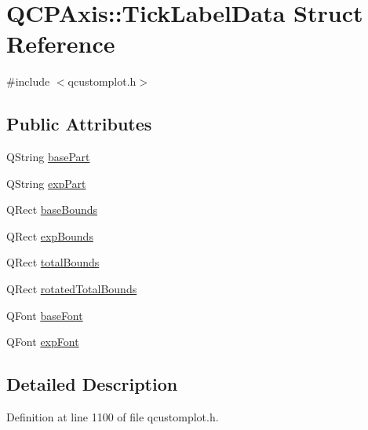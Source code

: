 \hypertarget{struct_q_c_p_axis_1_1_tick_label_data}{\section{Q\-C\-P\-Axis\-:\-:Tick\-Label\-Data Struct Reference}
\label{struct_q_c_p_axis_1_1_tick_label_data}
}


{\ttfamily \#include $<$qcustomplot.\-h$>$}

\subsection*{Public Attributes}
\begin{DoxyCompactItemize}
\item 
Q\-String \hyperlink{struct_q_c_p_axis_1_1_tick_label_data_a90d8d1e5d4706518e6b9e30371bf0346}{base\-Part}
\item 
Q\-String \hyperlink{struct_q_c_p_axis_1_1_tick_label_data_aa6dc7fb45b835a5fdd04ae28fc5e636f}{exp\-Part}
\item 
Q\-Rect \hyperlink{struct_q_c_p_axis_1_1_tick_label_data_a4613a53aca74ffe9436fdb584ef504fa}{base\-Bounds}
\item 
Q\-Rect \hyperlink{struct_q_c_p_axis_1_1_tick_label_data_a7207967211d6f6be4471b7fe746f40c5}{exp\-Bounds}
\item 
Q\-Rect \hyperlink{struct_q_c_p_axis_1_1_tick_label_data_a841fb63477661c658c14119602437670}{total\-Bounds}
\item 
Q\-Rect \hyperlink{struct_q_c_p_axis_1_1_tick_label_data_afcbc12845c7806eda1738b5380cfa24e}{rotated\-Total\-Bounds}
\item 
Q\-Font \hyperlink{struct_q_c_p_axis_1_1_tick_label_data_a2d8cb87e8644af7971f46da2cd28fc4e}{base\-Font}
\item 
Q\-Font \hyperlink{struct_q_c_p_axis_1_1_tick_label_data_ac27f21cae93669402bf7cc2ef1f3b7a1}{exp\-Font}
\end{DoxyCompactItemize}


\subsection{Detailed Description}


Definition at line 1100 of file qcustomplot.\-h.



